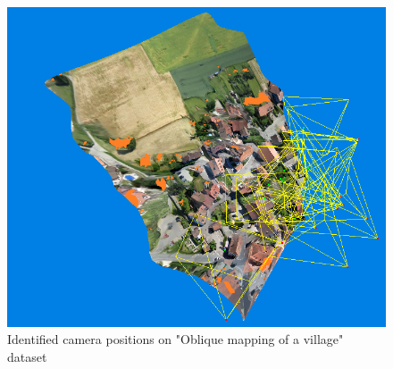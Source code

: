  \begin{figure}
\centering
  \includegraphics[width=\linewidth]{figs/cameras.png}
  \caption{Identified camera positions on "Oblique mapping of a village" dataset }
  \label{fig:cameras}
\end{figure}


